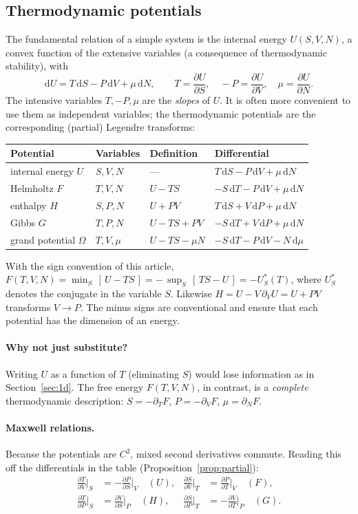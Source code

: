 \documentclass[11pt,a4paper]{article}
\newcommand{\dd}{\mathrm{d}}
\newcommand{\pder}[2]{\frac{\partial #1}{\partial #2}}
\theoremstyle{plain}
\theoremstyle{definition}
\theoremstyle{remark}
\begin{document}
\subsection{Thermodynamic potentials}

The fundamental relation of a simple system is the internal energy
$U(S,V,N)$, a convex function of the extensive variables (a consequence of
thermodynamic stability), with
\[
  \dd U=T\,\dd S-P\,\dd V+\mu\,\dd N,\qquad
  T=\pder US,\quad -P=\pder UV,\quad \mu=\pder UN .
\]
The intensive variables $T,-P,\mu$ are the \emph{slopes} of $U$.  It is
often more convenient to use them as independent variables; the thermodynamic
potentials are the corresponding (partial) Legendre transforms:
\begin{center}
\begin{tabular}{@{}llll@{}}
\toprule
Potential & Variables & Definition & Differential\\
\midrule
internal energy $U$ & $S,V,N$ & --- & $T\,\dd S-P\,\dd V+\mu\,\dd N$\\
Helmholtz $F$ & $T,V,N$ & $U-TS$ & $-S\,\dd T-P\,\dd V+\mu\,\dd N$\\
enthalpy $H$ & $S,P,N$ & $U+PV$ & $T\,\dd S+V\,\dd P+\mu\,\dd N$\\
Gibbs $G$ & $T,P,N$ & $U-TS+PV$ & $-S\,\dd T+V\,\dd P+\mu\,\dd N$\\
grand potential $\Omega$ & $T,V,\mu$ & $U-TS-\mu N$ & $-S\,\dd T-P\,\dd V-N\,\dd\mu$\\
\bottomrule
\end{tabular}
\end{center}
With the sign convention of this article, $F(T,V,N)=\min_S\,[\,U-TS\,]
=-\,\sup_S\,[\,TS-U\,]=-U^*_S(T)$, where $U^*_S$ denotes the conjugate in the
variable $S$.  Likewise $H=U-V\,\partial_VU=U+PV$ transforms $V\to P$.  The
minus signs are conventional and ensure that each potential has the dimension
of an energy.

\paragraph{Why not just substitute?}
Writing $U$ as a function of $T$ (eliminating $S$) would lose information as
in Section~\ref{sec:1d}.  The free energy $F(T,V,N)$, in contrast, is a
\emph{complete} thermodynamic description: $S=-\partial_TF$, $P=-\partial_VF$,
$\mu=\partial_NF$.

\paragraph{Maxwell relations.}
Because the potentials are $C^2$, mixed second derivatives commute.  Reading
this off the differentials in the table (Proposition~\ref{prop:partial}):
\begin{align*}
 \pder TV\bigg|_S&=-\pder PS\bigg|_V \quad(U), &
 \pder SV\bigg|_T&=\pder PT\bigg|_V \quad(F),\\
 \pder TP\bigg|_S&=\pder VS\bigg|_P \quad(H), &
 \pder SP\bigg|_T&=-\pder VT\bigg|_P \quad(G).
\end{align*}
\end{document}
